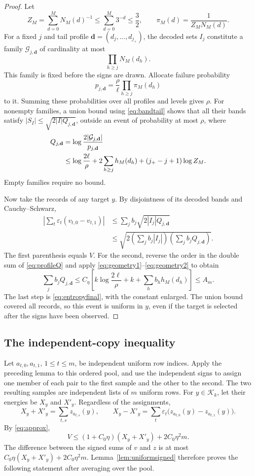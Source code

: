 \documentclass[11pt]{article}
\theoremstyle{remark}
\newcommand{\1}{\mathbf 1}
\newcommand{\K}{\mathcal K}
\begin{document}
\begin{proof}
Let
\[
 Z_M=\sum_{d=0}^M N_M(d)^{-1}\leq\sum_{d=0}^M3^{-d}\leq\frac32,
 \qquad \pi_M(d)=\frac1{Z_M N_M(d)}.
\]
For a fixed $j$ and tail profile
$\mathbf d=(d_j,\ldots,d_{j_+})$, the decoded sets $I_j$ constitute a
family $\mathcal G_{j,\mathbf d}$ of cardinality at most
\[
 \prod_{h\geq j}N_M(d_h).
\]
This family is fixed before the signs are drawn. Allocate failure
probability
\[
 p_{j,\mathbf d}=\frac\rho\ell\prod_{h\geq j}\pi_M(d_h)
\]
to it. Summing these probabilities over all profiles and levels gives
$\rho$. For nonempty families, a union bound using
\eqref{eq:bandtail} shows that all their bands satisfy
$|S_I|\leq\sqrt{2|I|Q_{j,\mathbf d}}$, outside an event of probability
at most $\rho$, where
\begin{align}
 Q_{j,\mathbf d}
 &=\log\frac{2|\mathcal G_{j,\mathbf d}|}{p_{j,\mathbf d}}\notag\\
 &\leq \log\frac{2\ell}{\rho}
 +2\sum_{h\geq j}h_M(d_h)
 +(j_+-j+1)\log Z_M.\label{eq:profileQ}
\end{align}
Empty families require no bound.

Now take the records of any target $y$. By disjointness of its decoded
bands and Cauchy--Schwarz,
\begin{align*}
 \left|\sum_t\varepsilon_t(v_{t,0}-v_{t,1})\right|
 &\leq\sum_j b_j\sqrt{2|I_j|Q_{j,\mathbf d}}\\
 &\leq\sqrt{2\left(\sum_jb_j|I_j|\right)
                   \left(\sum_jb_jQ_{j,\mathbf d}\right)}.
\end{align*}
The first parenthesis equals $V$. For the second, reverse the order in
the double sum of \eqref{eq:profileQ} and apply
\eqref{eq:geometry1}--\eqref{eq:geometry2} to obtain
\[
 \sum_jb_jQ_{j,\mathbf d}
 \leq C_\eta\left[
 k\log\frac{2\ell}{\rho}+k+\sum_hb_hh_M(d_h)\right]
 \leq A_m.
\]
The last step is \eqref{eq:entropyfinal}, with the constant enlarged.
The union bound covered all records, so this event is uniform in $y$,
even if the target is selected after the signs have been observed.
\end{proof}

\subsection{The independent-copy inequality}

Let $a_{t,0},a_{t,1}$, $1\leq t\leq m$, be independent uniform row
indices. Apply the preceding lemma to this ordered pool, and use the
independent signs to assign one member of each pair to the first sample
and the other to the second. The two resulting samples are independent
lists of $m$ uniform rows. For $y\in\K_k$, let their energies be
$X_y$ and $X'_y$. Regardless of the assignments,
\[
 X_y+X'_y=\sum_{t,s} z_{a_{t,s}}(y),
 \qquad
 X_y-X'_y=\sum_t\varepsilon_t
 \big(z_{a_{t,0}}(y)-z_{a_{t,1}}(y)\big).
\]
By \eqref{eq:approx},
\[
 V\leq(1+C_0\eta)(X_y+X'_y)+2C_0\eta^2m.
\]
The difference between the signed sums of $v$ and $z$ is at most
$C_0\eta(X_y+X'_y)+2C_0\eta^2m$. Lemma~\ref{lem:uniformsigned}
therefore proves the following statement after averaging over the pool.
\end{document}
